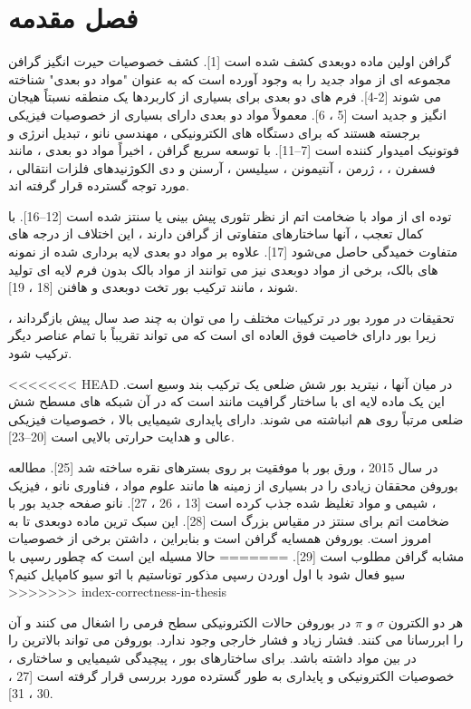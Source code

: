 ﻿\chapter{فصل مقدمه} 
\newpage
گرافن اولین ماده دوبعدی کشف شده است [1]. کشف خصوصیات حیرت انگیز گرافن مجموعه ای از مواد جدید را به وجود آورده است که به عنوان "مواد دو بعدی" شناخته می شوند [2-4]. فرم های دو بعدی برای بسیاری از کاربردها یک منطقه نسبتاً هیجان انگیز و جدید است [5 ، 6]. معمولاً مواد دو بعدی دارای بسیاری از خصوصیات فیزیکی برجسته هستند که برای دستگاه های الکترونیکی ، مهندسی نانو ، تبدیل انرژی و فوتونیک امیدوار کننده است [7–11]. با توسعه سریع گرافن ، اخیراً مواد دو بعدی ، مانند فسفرن ، 
 ، ژرمن ، آنتیمونن ، سیلیسن ، آرسنن و دی الكوژنیدهای فلزات انتقالی ، مورد توجه گسترده قرار گرفته اند.

توده ای از مواد با ضخامت اتم از نظر تئوری پیش بینی یا سنتز شده است [12–16]. با کمال تعجب ، آنها ساختارهای متفاوتی از گرافن دارند ، این اختلاف از درجه های متفاوت خمیدگی حاصل می‌شود [17]. علاوه بر مواد دو بعدی لایه برداری شده از نمونه های بالک، برخی از مواد دوبعدی نیز می توانند از مواد بالک بدون فرم لایه ای تولید شوند ، مانند ترکیب بور تخت دوبعدی   و هافنن [18 ، 19].

تحقیقات در مورد بور در ترکیبات مختلف را می توان به چند صد سال پیش بازگرداند ، زیرا بور دارای خاصیت فوق العاده ای است که می تواند تقریباً با تمام عناصر دیگر ترکیب شود.

<<<<<<< HEAD
در میان آنها ، نیترید بور شش ضلعی  یک ترکیب بند وسیع  است. این یک ماده لایه ای با ساختار گرافیت مانند است که در آن شبکه های مسطح شش ضلعی  مرتباً روی هم انباشته می شوند.  دارای پایداری شیمیایی بالا ، خصوصیات فیزیکی عالی و هدایت حرارتی بالایی است [20–23].

در سال 2015 ، ورق بور  با موفقیت بر روی بسترهای نقره   ساخته شد [25]. مطالعه بوروفن محققان زیادی را در بسیاری از زمینه ها مانند علوم مواد ، فناوری نانو ، فیزیک ، شیمی و مواد تغلیظ شده جذب کرده است [13 ، 26 ، 27].  نانو صفحه جدید بور با ضخامت اتم برای سنتز در مقیاس بزرگ است [28]. این سبک ترین ماده دوبعدی تا به امروز است. بوروفن همسایه گرافن است و بنابراین ، داشتن برخی از خصوصیات مشابه گرافن مطلوب است [29].
=======
حالا مسیله این است که چطور رسپی با سیو فعال شود
با اول اوردن رسپی مذکور توناستیم با اتو سیو کامپایل کنیم؟
>>>>>>> index-correctness-in-thesis

هر دو الکترون $\sigma$ و $\pi$ در بوروفن حالات الکترونیکی سطح فرمی را اشغال می کنند و آن را ابررسانا می کنند. فشار زیاد و فشار خارجی وجود ندارد. بوروفن می تواند بالاترین  را در بین مواد  داشته باشد. برای ساختارهای بور ، پیچیدگی شیمیایی و ساختاری ، خصوصیات الکترونیکی و پایداری به طور گسترده مورد بررسی قرار گرفته است [27 ، 30 ، 31].

